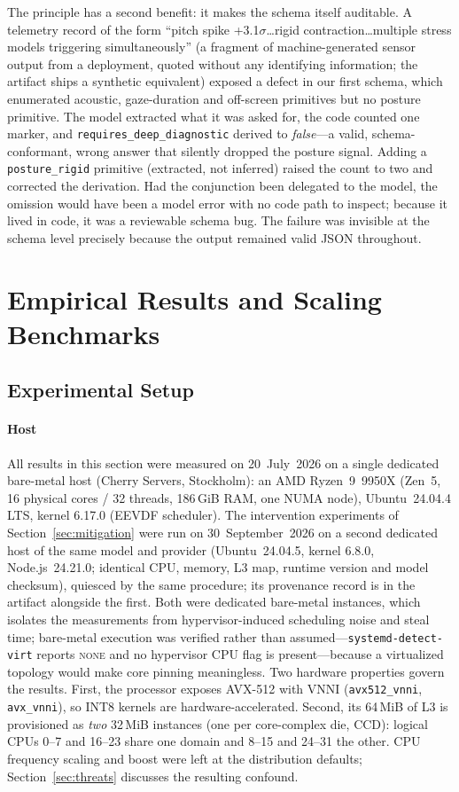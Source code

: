 \documentclass[conference]{IEEEtran}
\begin{document}
The principle has a second benefit: it makes the schema itself auditable. A telemetry record of the form ``pitch spike +3.1$\sigma$\ldots rigid contraction\ldots multiple stress models triggering simultaneously'' (a fragment of machine-generated sensor output from a deployment, quoted without any identifying information; the artifact ships a synthetic equivalent) exposed a defect in our first schema, which enumerated acoustic, gaze-duration and off-screen primitives but no posture primitive. The model extracted what it was asked for, the code counted one marker, and \texttt{requires\_deep\_diagnostic} derived to \emph{false}---a valid, schema-conformant, wrong answer that silently dropped the posture signal. Adding a \texttt{posture\_rigid} primitive (extracted, not inferred) raised the count to two and corrected the derivation. Had the conjunction been delegated to the model, the omission would have been a model error with no code path to inspect; because it lived in code, it was a reviewable schema bug. The failure was invisible at the schema level precisely because the output remained valid JSON throughout.

\section{Empirical Results and Scaling Benchmarks}
\label{sec:results}

\subsection{Experimental Setup}
\label{sec:setup}

\paragraph{Host} All results in this section were measured on 20~July~2026 on a single dedicated bare-metal host (Cherry Servers, Stockholm): an AMD Ryzen~9~9950X (Zen~5, 16 physical cores / 32 threads, 186\,GiB RAM, one NUMA node), Ubuntu~24.04.4 LTS, kernel 6.17.0 (EEVDF scheduler). The intervention experiments of Section~\ref{sec:mitigation} were run on 30~September~2026 on a second dedicated host of the same model and provider (Ubuntu~24.04.5, kernel 6.8.0, Node.js~24.21.0; identical CPU, memory, L3 map, runtime version and model checksum), quiesced by the same procedure; its provenance record is in the artifact alongside the first. Both were dedicated bare-metal instances, which isolates the measurements from hypervisor-induced scheduling noise and steal time; bare-metal execution was verified rather than assumed---\texttt{systemd-detect-virt} reports \textsc{none} and no hypervisor CPU flag is present---because a virtualized topology would make core pinning meaningless. Two hardware properties govern the results. First, the processor exposes AVX-512 with VNNI (\texttt{avx512\_vnni}, \texttt{avx\_vnni}), so INT8 kernels are hardware-accelerated. Second, its 64\,MiB of L3 is provisioned as \emph{two} 32\,MiB instances (one per core-complex die, CCD): logical CPUs 0--7 and 16--23 share one domain and 8--15 and 24--31 the other. CPU frequency scaling and boost were left at the distribution defaults; Section~\ref{sec:threats} discusses the resulting confound.
\end{document}
